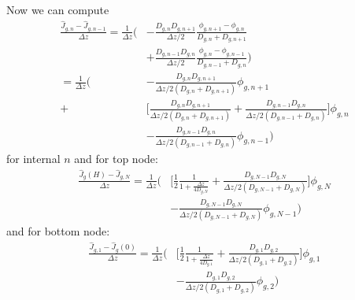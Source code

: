 \documentclass[english, a4paper, 12pt]{article}
\begin{document}
Now we can compute
\begin{align}
    \frac{\hat{J}_{g,n}-\hat{J}_{g,n-1}}{\Delta z} = \frac{1}{\Delta z}\biggl( 
    &-\frac{D_{g,n}D_{g,n+1}}{\Delta z/2}\frac{\phi_{g,n+1}-\phi_{g,n}}{D_{g,n}+ D_{g,n+1}} \\
    &+ \frac{D_{g,n-1}D_{g,n}}{\Delta z/2}\frac{\phi_{g,n}-\phi_{g,n-1}}{D_{g,n-1}+ D_{g,n}}
    \biggr)\\
    = \frac{1}{\Delta z}\biggl(
    &-\frac{D_{g,n}D_{g,n+1}}{\Delta z/2(D_{g,n}+ D_{g,n+1})}\phi_{g,n+1} \\
    +&\biggl[\frac{D_{g,n}D_{g,n+1}}{\Delta z/2(D_{g,n}+ D_{g,n+1})} + \frac{D_{g,n-1}D_{g,n}}{\Delta z/2(D_{g,n-1}+ D_{g,n})}\biggr]\phi_{g,n} \\
    &-\frac{D_{g,n-1}D_{g,n}}{\Delta z/2(D_{g,n-1}+ D_{g,n})}\phi_{g,n-1}
    \biggr)
\end{align}
for internal $n$ and for top node:
\begin{align}
    \frac{\hat{J}_{g}(H)-\hat{J}_{g,N}}{\Delta z}
    = \frac{1}{\Delta z}\biggl(
    &\biggl[\frac{1}{2}\frac{1}{1+\frac{\Delta z}{4D_{g,N}}} + \frac{D_{g,N-1}D_{g,N}}{\Delta z/2(D_{g,N-1}+ D_{g,N})}\biggr]\phi_{g,N} \\
    &-\frac{D_{g,N-1}D_{g,N}}{\Delta z/2(D_{g,N-1}+ D_{g,N})}\phi_{g,N-1}
    \biggr)
\end{align}
and for bottom node:
\begin{align}
    \frac{\hat{J}_{g,1}-\hat{J}_{g}(0)}{\Delta z}
    = \frac{1}{\Delta z}\biggl(
    &\biggl[\frac{1}{2}\frac{1}{1+\frac{\Delta z}{4D_{g,1}}} + \frac{D_{g,1}D_{g,2}}{\Delta z/2(D_{g,1}+ D_{g,2})}\biggr]\phi_{g,1} \\
    &-\frac{D_{g,1}D_{g,2}}{\Delta z/2(D_{g,1}+ D_{g,2})}\phi_{g,2}
    \biggr)
\end{align}
\end{document}
